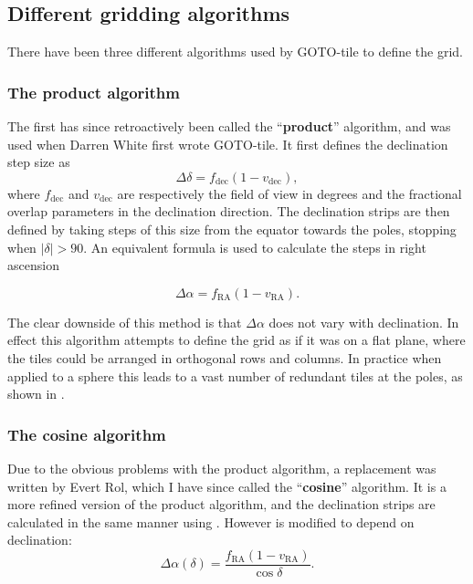 \begin{colsection}
\begin{colsection}
\end{colsection}


\subsection{Different gridding algorithms}
\label{sec:algorithms}
\begin{colsection}

There have been three different algorithms used by GOTO-tile to define the grid.

\subsubsection{The product algorithm}

The first has since retroactively been called the ``\textbf{product}'' algorithm, and was used when Darren White first wrote GOTO-tile. It first defines the declination step size as
%
\begin{equation}
    \Delta\delta = f_\text{dec}(1-v_\text{dec}),
    \label{eq:product_deltadelta}
\end{equation}
%
where $f_\text{dec}$ and $v_\text{dec}$ are respectively the field of view in degrees and the fractional overlap parameters in the declination direction. The declination strips are then defined by taking steps of this size from the equator towards the poles, stopping when $|\delta| > 90$. An equivalent formula is used to calculate the steps in right ascension

\begin{equation}
    \Delta\alpha = f_\text{RA}(1-v_\text{RA}).
    \label{eq:product_deltaalpha}
\end{equation}

The clear downside of this method is that $\Delta\alpha$ does not vary with declination. In effect this algorithm attempts to define the grid as if it was on a flat plane, where the tiles could be arranged in orthogonal rows and columns. In practice when applied to a sphere this leads to a vast number of redundant tiles at the poles, as shown in .

\subsubsection{The cosine algorithm}

Due to the obvious problems with the product algorithm, a replacement was written by Evert Rol, which I have since called the ``\textbf{cosine}'' algorithm. It is a more refined version of the product algorithm, and the declination strips are calculated in the same manner using . However  is modified to depend on declination:
%
\begin{equation}
    \Delta\alpha(\delta) = \frac{f_\text{RA}(1-v_\text{RA})}{\cos \delta}.
    \label{eq:cosine_deltaalpha}
\end{equation}


\end{colsection}
\end{colsection}
